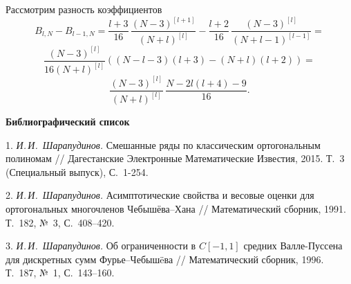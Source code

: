 \documentclass[12pt]{book}
\begin{document}
\newpage
\newpage




Рассмотрим разность коэффициентов
\begin{equation*}
  B_{l,N}-B_{l-1,N} = \frac{l+3}{16} \, \frac{(N-3)^{[l+1]}}{(N+l)^{[l]}}-
  \frac{l+2}{16} \, \frac{(N-3)^{[l]}}{(N+l-1)^{[l-1]}} =
\end{equation*}
\begin{equation*}
  \frac{(N-3)^{[l]}}{16(N+l)^{[l]}}\left(
    (N-l-3)(l+3) - (N+l)(l+2)
  \right)=
\end{equation*}
\begin{equation*}
  \frac{(N-3)^{[l]}}{(N+l)^{[l]}}\, \frac{N-2l(l+4)-9}{16}.
\end{equation*}

















\newpage
\newpage
























\newpage
\vspace*{3mm}
\textbf{Библиографический список}

1. \textit{И.\,И.~Шарапудинов.} Смешанные ряды по классическим ортогональным полиномам // Дагестанские Электронные Математические Известия, 2015. Т.~3 (Специальный выпуск), С.~1-254.

2. \textit{И.\,И.~Шарапудинов.} Асимптотические свойства и весовые оценки для ортогональных многочленов Чебыш\"ева–Хана // Математический сборник, 1991. Т.~182, №~3, С.~408–420.

3. \textit{И.\,И.~Шарапудинов.} Об ограниченности в $C[-1,1]$ средних Валле-Пуссена для дискретных сумм Фурье–Чебыш\"eва // Математический сборник, 1996. Т.~187, №~1, С.~143–160.
\end{document}
